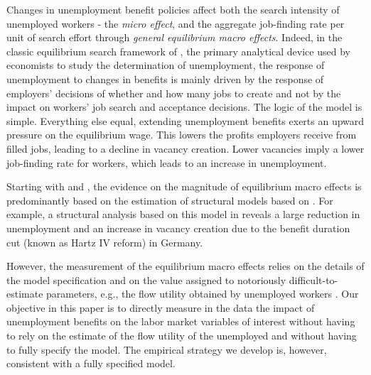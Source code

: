 \documentclass[12pt]{article}
\newcommand{\1}{\mathbf{1}}
\begin{document}
Changes in unemployment benefit policies affect both the search intensity of unemployed workers - the \emph{micro effect}, and the aggregate job-finding rate per unit of search effort through \emph{general equilibrium macro effects}. Indeed, in the classic equilibrium search framework of \citet{mortensen+pissarides:94}, the primary analytical device used by economists to study the determination of unemployment, the response of unemployment to changes in benefits is mainly driven by the response of employers’ decisions of whether and how many jobs to create and not by the impact on workers’ job search and acceptance decisions. The logic of the model is simple. Everything else equal, extending unemployment benefits exerts an upward pressure on the equilibrium wage. This lowers the profits employers receive from filled jobs, leading to a decline in vacancy creation. Lower vacancies imply a lower job-finding rate for workers, which leads to an increase in unemployment.

 Starting with \citet{millard+mortensen:97} and \citet{shi+wen:99}, the evidence on the magnitude of equilibrium macro effects is predominantly based on the estimation of structural models based on \citet{mortensen+pissarides:94}. For example, a structural analysis based on this model in \citet{krause+uhlig:12} reveals a large reduction in unemployment and an increase in vacancy creation due to the benefit duration cut (known as Hartz IV reform) in Germany. 

However, the measurement of the equilibrium macro effects relies on the details of the model specification and on the value assigned to notoriously difficult-to-estimate parameters, e.g., the flow utility obtained by unemployed workers \citep[][]{hagedorn+manovskii:08}. Our objective in this paper is to directly measure in the data the impact of unemployment benefits on the labor market variables of interest without having to rely on the estimate of the flow utility of the unemployed and without having to fully specify the model. The empirical strategy we develop is, however, consistent with a fully specified model.
\end{document}
